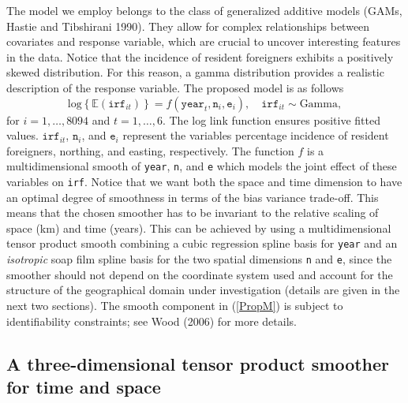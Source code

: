 \documentclass[10pt] {article}
\newcommand{\beq}{\begin{equation}}
\newcommand{\eeq}{\end{equation}}
\newcommand{\E}{\mathbb{E}}
\theoremstyle{definition}
\theoremstyle{plain}
\begin{document}
The model we employ belongs to the class of generalized additive models (GAMs, Hastie and Tibshirani 1990). They allow for  complex relationships between covariates and response variable, which are crucial to uncover interesting features in the data. Notice that the incidence of resident foreigners exhibits a positively skewed distribution. For this reason, a gamma distribution provides a realistic description of the response variable. The proposed model is as follows
\beq
\text{log}\left\{\E(\texttt{irf}_{it})\right\} = f(\texttt{year}_t,\texttt{n}_i,\texttt{e}_i), \quad \texttt{irf}_{it} \sim \text{Gamma},          
\label{PropM}
\eeq
for $i=1,\ldots,8094$ and $t=1,\ldots,6$. The log link function ensures positive fitted values. $\texttt{irf}_{it}$, $\texttt{n}_i$, and $\texttt{e}_i$ represent the variables percentage incidence of resident foreigners, northing, and easting, respectively. The function $f$ is a multidimensional smooth of \texttt{year}, \texttt{n}, and \texttt{e} which models the joint effect of these variables on \texttt{irf}. Notice that we want both the space and time dimension to have an optimal degree of smoothness in terms of the bias variance trade-off. This means that the chosen smoother has to be invariant to the relative scaling of space (km) and time (years). This can be achieved by using a multidimensional tensor product smooth combining a cubic regression spline basis for \texttt{year} and an \textit{isotropic} soap film spline basis for the two spatial dimensions \texttt{n} and \texttt{e}, since the smoother should not depend on the coordinate system used and account for the structure of the geographical domain under investigation (details are given in the next two sections). The smooth component in (\ref{PropM}) is subject to identifiability constraints; see Wood (2006) for more details.

\subsection{A three-dimensional tensor product smoother for time and space \label{3D}}
\end{document}
